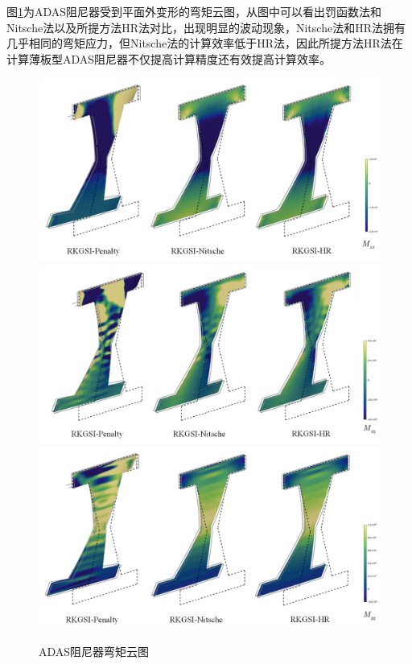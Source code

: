 图\ref{ADASM}为ADAS阻尼器受到平面外变形的弯矩云图，从图中可以看出罚函数法和Nitsche法以及所提方法HR法对比，出现明显的波动现象，Nitsche法和HR法拥有几乎相同的弯矩应力，但Nitsche法的计算效率低于HR法，因此所提方法HR法在计算薄板型ADAS阻尼器不仅提高计算精度还有效提高计算效率。
\begin{figure}[H]
    \centering
        \includegraphics[scale=0.5]{figure/DAMPER/ADAS/M11.png}
        \includegraphics[scale=0.5]{figure/DAMPER/ADAS/M12.png}
        \includegraphics[scale=0.5]{figure/DAMPER/ADAS/M22.png}
    \caption{ADAS阻尼器弯矩云图}\label{ADASM}
\end{figure}
